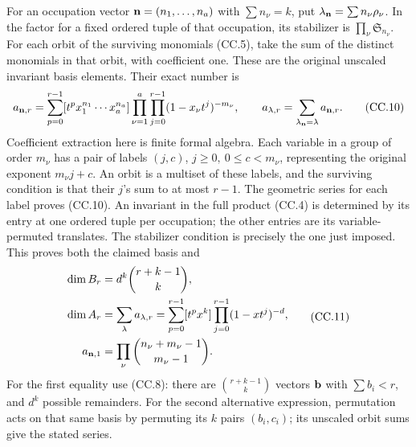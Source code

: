 For an occupation vector \({\bf n}=(n_1,\ldots,n_a)\) with
\(\sum n_\nu=k\), put \(\lambda_{\bf n}=\sum n_\nu\rho_\nu\).
In the factor for a fixed ordered tuple of that occupation, its
stabilizer is \(\prod_\nu\mathfrak S_{n_\nu}\).
For each orbit of the surviving monomials (CC.5), take the sum of
the distinct monomials in that orbit, with coefficient one.
These are the original unscaled invariant basis elements.
Their exact number is
\[
 a_{{\bf n},r}
 =\sum_{p=0}^{r-1}
 [t^p x_1^{n_1}\cdots x_a^{n_a}]
 \prod_{\nu=1}^a\prod_{j=0}^{r-1}
 (1-x_\nu t^j)^{-m_\nu},
 \qquad
 a_{\lambda,r}=\sum_{\lambda_{\bf n}=\lambda}a_{{\bf n},r}.
 \tag{CC.10}
\]
Coefficient extraction here is finite formal algebra.  Each variable
in a group of order \(m_\nu\) has a pair of labels
\((j,c)\), \(j\geq0,\ 0\leq c<m_\nu\), representing the original
exponent \(m_\nu j+c\).  An orbit is a multiset of these labels,
and the surviving condition is that their \(j\)'s sum to at most
\(r-1\).  The geometric series for each label proves (CC.10).
An invariant in the full product (CC.4) is determined by its entry
at one ordered tuple per occupation; the other entries are its
variable-permuted translates.  The stabilizer condition is precisely
the one just imposed.  This proves both the claimed basis and
\[
\begin{aligned}
 \dim B_r&=d^k\binom{r+k-1}{k},\\
 \dim A_r&=\sum_\lambda a_{\lambda,r}
 =\sum_{p=0}^{r-1}[t^p x^k]
       \prod_{j=0}^{r-1}(1-xt^j)^{-d},\\
 a_{{\bf n},1}&=\prod_\nu\binom{n_\nu+m_\nu-1}{m_\nu-1}.
\end{aligned}
\tag{CC.11}
\]
For the first equality use (CC.8): there are
\(\binom{r+k-1}{k}\) vectors \({\bf b}\) with \(\sum b_i<r\),
and \(d^k\) possible remainders.  For the second alternative expression,
permutation acts on that same basis by permuting its \(k\) pairs
\((b_i,c_i)\); its unscaled orbit sums give the stated series.

